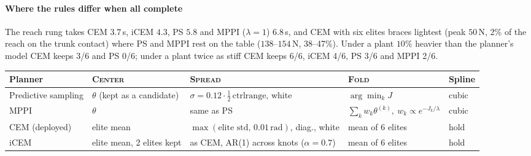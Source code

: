 \paragraph{Where the rules differ when all complete} %
The reach rung takes CEM $3.7$\,s, iCEM $4.3$, PS $5.8$ and MPPI
($\lambda=1$) $6.8$\,s, and CEM with six elites braces lightest (peak
$50$\,N, 2\% of the reach on the trunk contact) where PS and MPPI rest on the
table ($138$--$154$\,N, 38--47\%). Under a plant $10\%$ heavier than the
planner's model CEM keeps 3/6 and PS 0/6; under a plant twice as stiff CEM
keeps 6/6, iCEM 4/6, PS 3/6 and MPPI 2/6.


\label{tab:planners}
\centering
\small
\setlength{\tabcolsep}{3pt}
\begin{tabular}{@{}lllll@{}}
\toprule
Planner & \textsc{Center} & \textsc{Spread} & \textsc{Fold} & Spline \\
\midrule
Predictive sampling & $\theta$ (kept as a candidate) & $\sigma = 0.12\cdot\tfrac12\,\mathrm{ctrlrange}$, white & $\arg\min_k J$ & cubic \\
MPPI                & $\theta$ & same as PS & $\sum_k w_k\theta^{(k)},\ w_k\propto e^{-J_k/\lambda}$ & cubic \\
CEM (deployed)      & elite mean & $\max(\text{elite std},\,0.01\,\mathrm{rad})$, diag., white & mean of 6 elites & hold \\
iCEM                & elite mean, 2 elites kept & as CEM, AR(1) across knots ($\alpha=0.7$) & mean of 6 elites & hold \\
\bottomrule
\end{tabular}


